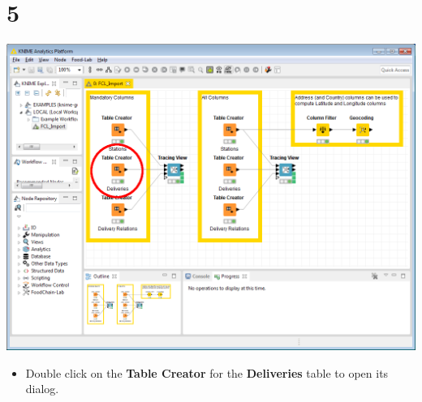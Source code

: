 \documentclass[10pt]{beamer}
\begin{document}
\section{5}
\begin{frame}
	\begin{center}
  		\includegraphics[height=0.6\textheight]{5.png}
	\end{center}
	\begin{itemize}
		\item Double click on the \textbf{Table Creator} for the \textbf{Deliveries} table to open its dialog.
	\end{itemize}
\end{frame}
\end{document}
